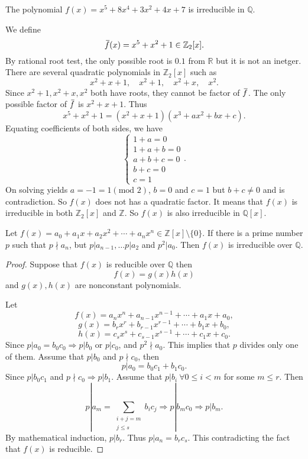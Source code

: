 \begin{example}
    The polynomial $f(x) = x^5 + 8x^4 + 3x^2 + 4x + 7$ is irreducible in $\mathbb{Q}$.
\end{example}
\begin{solution}
    We define
    \[
        \,\overline{\!{f}}(x) = x^5 + x^2 + 1 \in \mathbb{Z}_2[x].
    \]
    By rational root test, the only possible root is $0.1$ from $\mathbb{R}$ but it is not an inetger.
    There are several quadratic polynomials in $\mathbb{Z}_2[x]$ such as 
    \[
        x^2 + x + 1, \quad x^2 + 1,\quad x^2 + x, \quad x^2.
    \]
    Since $x^2 + 1, x^2 + x, x^2$ both have roots, they cannot be factor of $\,\overline{\!{f}}$. The only possible 
    factor of $\,\overline{\!{f}}$ is $x^2 + x + 1$. Thus 
    \[
        x^5 + x^2 + 1 = (x^2 + x+ 1)(x^3 + ax^2 + bx + c).
    \]
    Equating coefficients of both sides, we have 
    \[
        \begin{cases}
            1 + a = 0\\
            1 + a + b = 0\\
            a + b + c = 0\\
            b + c = 0\\
            c = 1
        \end{cases}.
    \]
    On solving yields $a = -1 = 1 (\text{mod } 2)$,\> $b = 0$ and $c = 1$ but $b + c \neq 0$ and is contradiction.
    So $f(x)$ does not has a quadratic factor. It means that $f(x)$ is irreducible in both 
    $\mathbb{Z}_2[x]$ and $\mathbb{Z}$. So $f(x)$ is also irreducible in $\mathbb{Q}[x]$. 
\end{solution}

\begin{theorem}
    Let $f(x) = a_0 + a_1x + a_2x^2 + \cdots + a_nx^n \in \mathbb{Z}[x] \setminus \{ 0 \}$. 
    If there is a prime number $p$ such that 
    $p \nmid a_n$, but $p | a_{n-1}, \ldots p | a_{2}$ and $p^2 | a_0$. Then $f(x)$ is 
    irreducible over $\mathbb{Q}$.
\end{theorem}
\begin{proof}
    Suppose that $f(x)$ is reducible over $\mathbb{Q}$ then 
    \[
        f(x) = g(x) h(x)
    \] 
    and $g(x), h(x)$ are nonconstant polynomials.

    Let 
    \[
        f(x) = a_nx^n + a_{n-1}x^{n-1} + \cdots + a_1x + a_0,
    \]
    \[
        g(x) = b_rx^r + b_{r-1}x^{r-1} + \cdots + b_1x + b_0,
    \]
    \[
        h(x) = c_sx^s + c_{s-1}x^{s-1} + \cdots + c_1x + c_0.
    \]
    Since $p|a_0 =b_0c_0 \Longrightarrow p | b_0$ or $p|c_0$, and $p^2 \nmid a_0$. This implies that 
    $p$ divides only one of them. Assume that $p | b_0$ and $p \nmid c_0$, then 
    \[
        p|a_0 = b_0c_1 + b_1c_0.
    \]
    Since $p|b_0c_1$ and $p \nmid c_0 \Longrightarrow p|b_1$. Assume that $p|b_i \> \forall 0 \leq i < m$ 
    for some $m \leq r$. Then 
    \[
        p|a_m = \sum_{\substack{i+j=m \\ j \leq s}} b_ic_j \Longrightarrow p|b_mc_0 \Longrightarrow p|b_m.
    \]
    By mathematical induction, $p|b_r$. Thus $p|a_n = b_rc_s$. This contradicting the fact that $f(x)$ 
    is reducible.
\end{proof}

